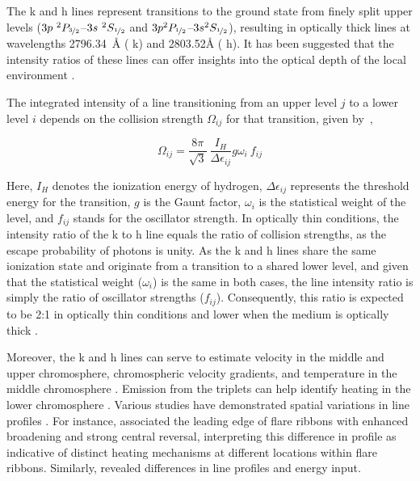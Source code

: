 The   k and h lines represent transitions to the ground state from finely split upper levels ($3p~^{2}P_{\nicefrac{3}{2}}${--}$3s~^{2}S_{\nicefrac{1}{2}}$ and $3p ^{2}P_{\nicefrac{1}{2}}${--}$3s^{2}S_{\nicefrac{1}{2}}$), resulting in optically thick lines at wavelengths 2796.34~{\AA} (  k) and 2803.52{\AA} (  h). It has been suggested that the intensity ratios of these lines can offer insights into the optical depth of the local environment \citep{kerr15}.

The integrated intensity of a line transitioning from an upper level $j$ to a lower level $i$ depends on the collision strength $\Omega_{ij}$ for that transition, given by~\citep{henri62,mariska92},

\begin{equation*}
\Omega_{ij}=\frac{8\pi}{\sqrt{3}}~\frac{I_{H}}{\Delta \epsilon_{ij}}g\omega_{i}~f_{ij}
\end{equation*}

\noindent Here, $I_{H}$ denotes the ionization energy of hydrogen, $\Delta \epsilon_{ij}$ represents the threshold energy for the transition, $g$ is the Gaunt factor, $\omega_{i}$ is the statistical weight of the level, and $f_{ij}$ stands for the oscillator strength. In optically thin conditions, the intensity ratio of the k to h line equals the ratio of collision strengths, as the escape probability of photons is unity. As the   k and h lines share the same ionization state and originate from a transition to a shared lower level, and given that the statistical weight ($\omega_{i}$) is the same in both cases, the line intensity ratio is simply the ratio of oscillator strengths ($f_{ij}$). Consequently, this ratio is expected to be 2:1 in optically thin conditions and lower when the medium is optically thick \citep{kerr15,levens19}.

Moreover, the   k and h lines can serve to estimate velocity in the middle and upper chromosphere, chromospheric velocity gradients, and temperature in the middle chromosphere \citep{leenarts13a,leenarts13b,pereira13}. Emission from the   triplets can help identify heating in the lower chromosphere \citep{pereira15}. Various studies have demonstrated spatial variations in   line profiles \citep{dalda23,panos18}. For instance, \cite{polito23} associated the leading edge of flare ribbons with enhanced broadening and strong central reversal, interpreting this difference in profile as indicative of distinct heating mechanisms at different locations within flare ribbons. Similarly, \cite{panos21,panos21_2} revealed differences in line profiles and energy input.


